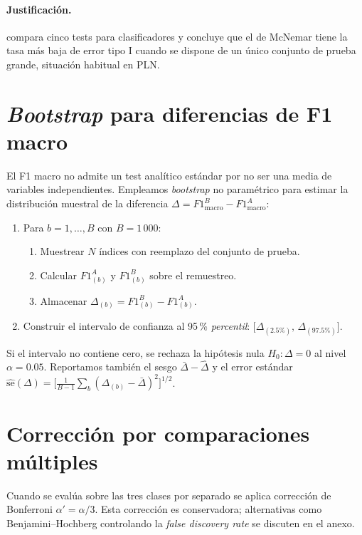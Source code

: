 \paragraph{Justificación.} \citet{dietterich1998approximate} compara
cinco tests para clasificadores y concluye que el de McNemar tiene la
tasa más baja de error tipo I cuando se dispone de un único conjunto
de prueba grande, situación habitual en PLN.

\section{\emph{Bootstrap} para diferencias de F1 macro}

El F1 macro no admite un test analítico estándar por no ser una media
de variables independientes. Empleamos \emph{bootstrap} no paramétrico
\citep{efron1993introduction} para estimar la distribución muestral de
la diferencia $\Delta = F1^B_{\text{macro}} - F1^A_{\text{macro}}$:

\begin{enumerate}[leftmargin=*,itemsep=0.2em]
  \item Para $b = 1, \dots, B$ con $B = 1\,000$:
        \begin{enumerate}
          \item Muestrear $N$ índices con reemplazo del conjunto de
                prueba.
          \item Calcular $F1^A_{(b)}$ y $F1^B_{(b)}$ sobre el remuestreo.
          \item Almacenar $\Delta_{(b)} = F1^B_{(b)} - F1^A_{(b)}$.
        \end{enumerate}
  \item Construir el intervalo de confianza al 95\,\%
        \emph{percentil}:
        $\bigl[\Delta_{(2.5\%)},\, \Delta_{(97.5\%)}\bigr]$.
\end{enumerate}

Si el intervalo no contiene cero, se rechaza la hipótesis nula
$H_0: \Delta = 0$ al nivel $\alpha = 0.05$. Reportamos también el
sesgo $\bar\Delta - \hat\Delta$ y el error estándar
$\widehat{\mathrm{se}}(\Delta) =
\bigl[\frac{1}{B-1}\sum_b (\Delta_{(b)} - \bar\Delta)^2\bigr]^{1/2}$.

\section{Corrección por comparaciones múltiples}

Cuando se evalúa sobre las tres clases por separado se aplica
corrección de Bonferroni $\alpha' = \alpha / 3$. Esta corrección es
conservadora; alternativas como Benjamini--Hochberg controlando la
\emph{false discovery rate} se discuten en el anexo.

